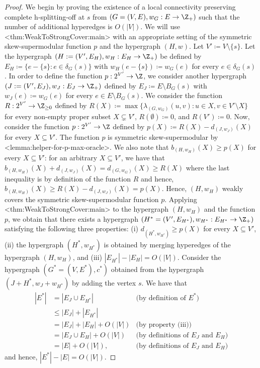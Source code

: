 \documentclass{article}
\def\Cref#1{<#1>}%
\newcommand{\knote}[1]{{\color{red}[{\tiny Karthik: \bf #1}]\marginpar{\color{red}*}}}
\begin{document}
\begin{proof}
    We begin by proving the existence of a local connectivity preserving complete h-splitting-off at $s$ from $(G=(V, E), w_G: E\rightarrow \Z_+)$ such that the number of additional hyperedges is $O(|V|)$. 
    We will use \Cref{thm:WeakToStrongCover:main} with an appropriate setting of the symmetric skew-supermodular function $p$ and the hypergraph $(H, w)$. 
    Let $V'\coloneqq V\setminus \{s\}$. 
    Let the hypergraph $(H:=(V', E_H), w_H: E_H\rightarrow \Z_+)$ be defined by $E_H\coloneqq \{e-\{s\}: e\in \delta_G(s)\}$ with $w_H(e-\{s\})\coloneqq w_G(e)$ for every $e\in \delta_G(s)$. 
    In order to define the function $p: 2^{V'}\rightarrow \Z$, we consider another hypergraph $(J:=({V'}, E_J), w_J: E_J\rightarrow \Z_+)$ defined by $E_J\coloneqq E\setminus B_G(s)$ with $w_J(e)\coloneqq w_G(e)$ for every $e\in E\setminus B_G(s)$. 
    We consider the function $R:2^{V'}\rightarrow \Z_{\ge 0}$ defined by $R(X)\coloneqq \max\{\lambda_{(G, w_G)}(u, v): u\in X, v\in V'\setminus X\}$ for every non-empty proper subset $X\subsetneq  V'$, $R(\emptyset)\coloneqq 0$, and $R(V')\coloneqq 0$. 
    Now, consider the function $p: 2^{V'}\rightarrow \Z$ defined by $p(X)\coloneqq R(X)-d_{(J, w_J)}(X)$ for every $X\subseteq {V'}$. 
    The function $p$ is symmetric skew-supermodular by \Cref{lemma:helper-for-p-max-oracle}. 
    We also note that $b_{(H, w_H)}(X)\ge p(X)$ for every $X\subseteq {V'}$: for an arbitrary $X\subseteq {V'}$, we have that $b_{(H, w_H)}(X)+d_{(J, w_J)}(X)=d_{(G, w_G)}(X)\ge R(X)$ where the last inequality is by definition of the function $R$ and hence, $b_{(H, w_H)}(X)\ge R(X)-d_{(J, w_J)}(X)=p(X)$. 
    Hence, $(H,w_H)$ weakly covers the symmetric skew-supermodular function $p$. 
    Applying \Cref{thm:WeakToStrongCover:main} to the hypergraph $(H, w_H)$ and the function $p$, we obtain that there exists a hypergraph $(H^* = (V', E_{H^*}), w_{H^*}: E_{H^*}\rightarrow \Z_+)$ satisfying the following three properties: (i) $d_{(H^*, w_{H^*})}\ge p(X)$ for every $X\subseteq V'$,  (ii) the hypergraph $(H^*, w_{H^*})$ is obtained by merging hyperedges of the hypergraph $(H, w_H)$, and (iii) $|E_{H^*}|-|E_H|=O(|V|)$. 
    Consider the hypergraph $(G^*=(V, E^*), c^*)$ obtained from the hypergraph $(J+H^*, w_J+w_{H^*})$ by adding the vertex $s$. 
    We have that 
    \begin{align*}
    |E^*|
    &=|E_J\cup E_{H^*}| &\text{(by definition of $E^*$)}\\
    &\le |E_J|+|E_{H^*}| &\\
    &=|E_J|+|E_H|+O(|V|) & \text{(by property (iii))}\\
    &=|E_J\cup E_H|+O(|V|) & \text{(by definitions of $E_J$ and $E_H$)}\\
    &=|E|+O(|V|), & \text{(by definitions of $E_J$ and $E_H$)}
    \end{align*}
    and hence, $|E^*|-|E|=O(|V|)$. 
    

\end{proof}
\end{document}
